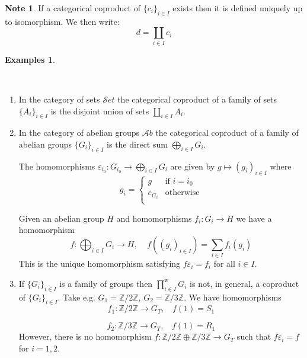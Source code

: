 \documentclass[12pt, letterpaper, oneside]{article}
\theoremstyle{plain}
\theoremstyle{definition}
\newtheorem{examples}[theorem]{Examples}
\newtheorem{note}[theorem]{Note}
\newcommand{\Z}{{\mathbb Z}}
\newcommand{\Ab}{{\mathcal Ab}}
\newcommand{\Set}{{\mathcal Set}}
\newcommand{\benu}{\begin{enumerate}}
\newcommand{\eenu}{\end{enumerate}}
\newcommand{\vs}{\vskip 5mm}
\newcommand{\isep}[1][0]{\setlength{\itemsep}{#1 mm}}
\begin{document}
\vs 


\begin{note}
If a categorical coproduct of $\{c_{i}\}_{i\in I}$ exists then it is defined uniquely up to isomorphism. 
We then write:
$$d = \coprod_{i\in I} c_{i}$$
\end{note}

\vs

\begin{examples} \ 

\vskip -13mm

\ 
\benu
\isep[6]
\item In the category of sets $\Set$ the categorical coproduct of a family of sets $\{A_{i}\}_{i\in I}$
is the disjoint union of sets $\coprod_{i\in I} A_{i}$. 

\item In the category of abelian groups $\Ab$ the categorical coproduct of a family of abelian groups 
$\{G_{i}\}_{i\in I}$ is the direct sum $\bigoplus_{i\in I} G_{i}$.

The homomorphisms $\varepsilon_{i_{0}} \colon G_{i_{0}} \to \bigoplus_{i\in I} G_{i}$
are given by $g \mapsto ( g_{i})_{i\in I}$ where
$$
g_{i} = 
\left\{
\begin{array}{ll}
g & \text{if \ } i=i_{0} \\
e_{G_{i}} & \text{otherwise} \\
\end{array}
\right.
$$ 

Given an abelian group $H$ and homomorphisms $f_{i}\colon G_{i} \to H$ we have a homomorphism
$$f\colon \bigoplus_{i\in I} G_{i} \to H, \ \ \ \ \ f((g_{i})_{i\in I}) = \sum_{i\in I} f_{i}(g_{i})$$
This is the unique homomorphism satisfying $f\varepsilon_{i} = f_{i}$ for all $i\in I$.

\item If $\{ G_{i}\}_{i\in I}$ is a family of groups then $\prod^{\mathrm{w}}_{i\in I}G_{i}$ is not, 
 in general, a coproduct of $\{G_{i}\}_{i\in I}$. Take e.g. $G_{1}=\Z/2\Z$, $G_{2}= \Z/3\Z$. 
We have homomorphisms 
$$f_{1}\colon \Z/2\Z \to G_{T}, \ \ \ \ f(1) = S_{1} $$

\vskip -9mm

$$f_{2}\colon \Z/3\Z \to G_{T}, \ \ \ \ f(1) = R_{1} $$
However, there is no homomorphism $f\colon \Z/2\Z \oplus \Z/3\Z \to G_{T}$ such that 
$f\varepsilon_{i} = f$ for $i=1, 2$.
\eenu

\end{examples}


\vs\vs
\end{document}
